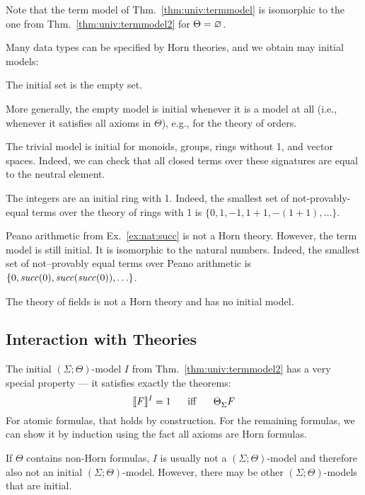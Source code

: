 Note that the term model of Thm.~\ref{thm:univ:termmodel} is isomorphic to the one from Thm.~\ref{thm:univ:termmodel2} for $\Theta=\varnothing$.

\begin{example}
Many data types can be specified by Horn theories, and we obtain may initial models:
\begin{compactitem}
\item The initial set is the empty set.
\item More generally, the empty model is initial whenever it is a model at all (i.e., whenever it satisfies all axioms in $\Theta$), e.g., for the theory of orders.
\item The trivial model is initial for monoids, groups, rings without 1, and vector spaces.
Indeed, we can check that all closed terms over these signatures are equal to the neutral element.
\item The integers are an initial ring with 1.
Indeed, the smallest set of not-provably-equal terms over the theory of rings with 1 is $\{0,1,-1,1+1,-(1+1),\ldots\}$.
\item Peano arithmetic from Ex.~\ref{ex:nat:succ} is not a Horn theory. However, the term model is still initial.
It is isomorphic to the natural numbers.
Indeed, the smallest set of not--provably equal terms over Peano arithmetic is $\{0,\mathit{succ}(0),\mathit{succ}(\mathit{succ}(0)),\ldots\}$.
\item The theory of fields is not a Horn theory and has no initial model.
\end{compactitem}
\end{example}

\subsection{Interaction with Theories}

The initial $(\Sigma;\Theta)$-model $I$ from Thm.~\ref{thm:univ:termmodel2} has a very special property --- it satisfies exactly the theorems:
\[\semm{F}{I}=1\tb\miff\tb \iscons{\Sigma}{}{\Theta}{F}\]
For atomic formulas, that holds by construction.
For the remaining formulas, we can show it by induction using the fact all axioms are Horn formulas.

If $\Theta$ contains non-Horn formulas, $I$ is usually not a $(\Sigma;\Theta)$-model and therefore also not an initial $(\Sigma;\Theta)$-model.
However, there may be other $(\Sigma;\Theta)$-models that are initial.

